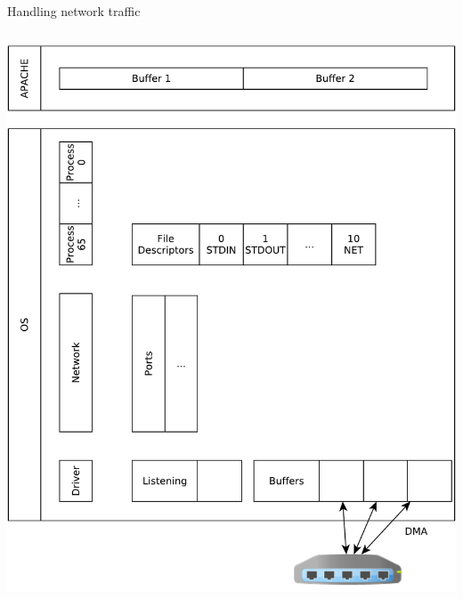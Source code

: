 \documentclass{beamer}
\begin{document}
\begin{frame}[t,fragile]{Handling network traffic}
\begin{columns}
\begin{column}[t]{0.5\textwidth}
\begin{center}
{  \includegraphics[width=1\linewidth]{sock_mem_1}
     }
\end{center}
\end{column}
\end{columns}
\end{frame}
\end{document}
